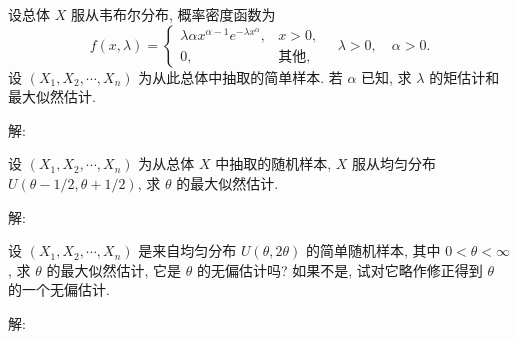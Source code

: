 \documentclass[standard]{ExBook}
\begin{document}
\begin{qitems}
    \begin{bbox}
    \begin{shaded}
        \qitem
设总体 \( X \) 服从韦布尔分布, 概率密度函数为
\[f(x, \lambda) =
\begin{cases}
\lambda \alpha x^{\alpha-1} e^{-\lambda x^\alpha}, & x > 0, \\
0, & \text{其他},
\end{cases}
\quad \lambda > 0, \quad \alpha > 0.\]
设 \( (X_1, X_2, \cdots, X_n) \) 为从此总体中抽取的简单样本. 若 \( \alpha \) 已知, 求 \( \lambda \) 的矩估计和最大似然估计.
    \end{shaded}
    \end{bbox}

\vspace{-5em}

    \begin{bbox}
解: 
    \end{bbox}

\vspace{-5em}

    \begin{bbox}
    \begin{shaded}
        \qitem
设 \((X_1, X_2, \cdots, X_n)\) 为从总体 \(X\) 中抽取的随机样本, \(X\) 服从均匀分布 \(U(\theta - 1/2, \theta + 1/2)\), 求 \(\theta\) 的最大似然估计.
    \end{shaded}
    \end{bbox}

\vspace{-5em}

    \begin{bbox}
解: 
    \end{bbox}

\vspace{-5em}

    \begin{bbox}
    \begin{shaded}
        \qitem
设 \((X_1, X_2, \cdots, X_n)\) 是来自均匀分布 \(U(\theta, 2\theta)\) 的简单随机样本, 其中 \(0 < \theta < \infty\), 求 \(\theta\) 的最大似然估计, 它是 \(\theta\) 的无偏估计吗? 如果不是, 试对它略作修正得到 \(\theta\) 的一个无偏估计.
    \end{shaded}
    \end{bbox}

\vspace{-5em}

    \begin{bbox}
解: 
    \end{bbox}


\end{qitems}
\end{document}
